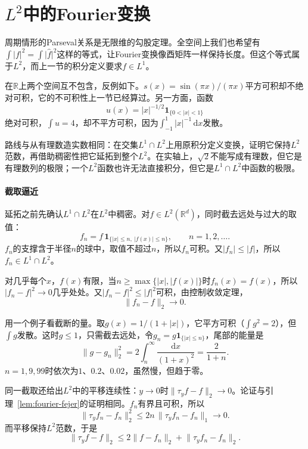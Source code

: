 \section{\texorpdfstring{$L^2$}{L2}中的Fourier变换}
\label{sec:fourier-l2}

周期情形的Parseval关系是无限维的勾股定理。全空间上我们也希望有$\int\lvert f\rvert^2=\int\lvert\widehat f\rvert^2$这样的等式，让Fourier变换像酉矩阵一样保持长度。但这个等式属于$L^2$，而上一节的积分定义要求$f\in L^1$。

在$\mathbb R$上两个空间互不包含，反例如下。$s(x)=\sin(\pi x)/(\pi x)$平方可积却不绝对可积，它的不可积性上一节已经算过。另一方面，函数
\[
u(x)=\lvert x\rvert^{-1/2}\mathbf 1_{\{0<\lvert x\rvert<1\}}
\]
绝对可积，$\int u=4$，却不平方可积，因为$\int_{-1}^1\lvert x\rvert^{-1}\,\mathrm dx$发散。

路线与从有理数造实数相同：在交集$L^1\cap L^2$上用原积分定义变换，证明它保持$L^2$范数，再借助稠密性把它延拓到整个$L^2$。在实轴上，$\sqrt2$不能写成有理数，但它是有理数列的极限；一个$L^2$函数也许无法直接积分，但它是$L^1\cap L^2$中函数的极限。

\paragraph{截取逼近}

延拓之前先确认$L^1\cap L^2$在$L^2$中稠密。对$f\in L^2(\mathbb R^d)$，同时截去远处与过大的取值：
\[
f_n=f\,\mathbf 1_{\{\lvert x\rvert\leq n,\ \lvert f(x)\rvert\leq n\}},\qquad n=1,2,\ldots .
\]
$f_n$的支撑含于半径$n$的球中，取值不超过$n$，所以$f_n$可积。又$\lvert f_n\rvert\leq\lvert f\rvert$，所以$f_n\in L^1\cap L^2$。

对几乎每个$x$，$f(x)$有限，当$n\geq\max\{\lvert x\rvert,\lvert f(x)\rvert\}$时$f_n(x)=f(x)$，所以$\lvert f_n-f\rvert^2\to0$几乎处处。又$\lvert f_n-f\rvert^2\leq\lvert f\rvert^2$可积，由控制收敛定理，
\[
\lVert f_n-f\rVert_2\to0.
\]

用一个例子看截断的量。取$g(x)=1/(1+\lvert x\rvert)$，它平方可积（$\int g^2=2$），但$\int g$发散。这时$g\leq1$，只需截去远处，令$g_n=g\mathbf 1_{\{\lvert x\rvert\leq n\}}$，尾部的能量是
\[
\lVert g-g_n\rVert_2^2=2\int_n^\infty\frac{\mathrm dx}{(1+x)^2}=\frac2{1+n}.
\]
$n=1,9,99$时依次为$1$、$0.2$、$0.02$，虽然慢，但趋于零。

同一截取还给出$L^2$中的平移连续性：$y\to0$时$\lVert\tau_yf-f\rVert_2\to0$。论证与引理~\ref{lem:fourier-fejer}的证明相同。$f_n$有界且可积，所以
\[
\lVert\tau_yf_n-f_n\rVert_2^2\leq2n\,\lVert\tau_yf_n-f_n\rVert_1\to0.
\]
而平移保持$L^2$范数，于是
\[
\lVert\tau_yf-f\rVert_2\leq2\lVert f-f_n\rVert_2+\lVert\tau_yf_n-f_n\rVert_2.
\]

